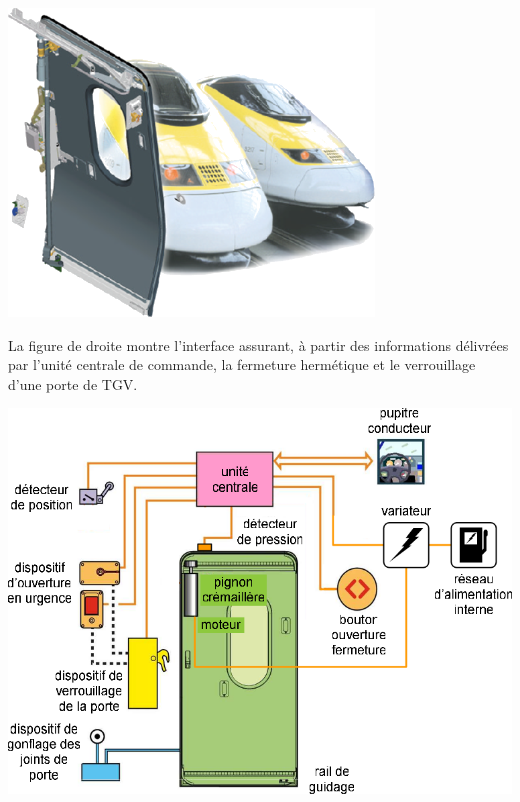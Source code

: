 \documentclass[10pt]{article}
\begin{document}
\begin{minipage}[c]{.45\linewidth}
\begin{center}
\includegraphics[width=.6\textwidth]{images/fig_01}
\end{center}
 
 La figure de droite montre l’interface assurant, à partir des informations délivrées par l’unité centrale de commande, la fermeture hermétique et le verrouillage d’une porte de TGV. 
 
\end{minipage} \hfill
\begin{minipage}[c]{.52\linewidth}
\begin{center}
\includegraphics[width=\textwidth]{images/fig_02}
\end{center}
\end{minipage}
\end{document}
